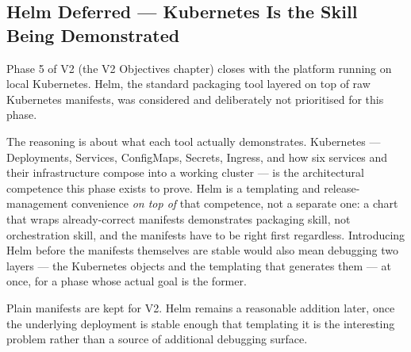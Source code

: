 \subsection{Helm Deferred --- Kubernetes Is the Skill Being Demonstrated}

Phase 5 of V2 (the V2 Objectives chapter) closes with the platform running on local Kubernetes. Helm, the standard packaging tool layered on top of raw Kubernetes manifests, was considered and deliberately not prioritised for this phase.

The reasoning is about what each tool actually demonstrates. Kubernetes --- Deployments, Services, ConfigMaps, Secrets, Ingress, and how six services and their infrastructure compose into a working cluster --- is the architectural competence this phase exists to prove. Helm is a templating and release-management convenience \emph{on top of} that competence, not a separate one: a chart that wraps already-correct manifests demonstrates packaging skill, not orchestration skill, and the manifests have to be right first regardless. Introducing Helm before the manifests themselves are stable would also mean debugging two layers --- the Kubernetes objects and the templating that generates them --- at once, for a phase whose actual goal is the former.

Plain manifests are kept for V2. Helm remains a reasonable addition later, once the underlying deployment is stable enough that templating it is the interesting problem rather than a source of additional debugging surface.
